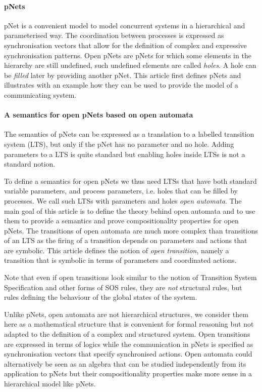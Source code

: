 \documentclass{elsarticle}
\begin{document}
\paragraph{pNets}
pNet is a convenient model to model concurrent systems in a hierarchical and parameterised way. The coordination between processes is expressed as synchronisation vectors that allow for the definition of complex and expressive synchronisation patterns.
Open pNets are pNets for which some elements in the hierarchy are still undefined, such undefined elements are called \emph{holes}. A hole can be \emph{filled} later by providing another pNet.
This article first defines pNets and illustrates with an example how they can be used to provide the model of a communicating system. 

\paragraph{A semantics for open pNets based on open automata}
The semantics of pNets can be expressed as a translation to a labelled transition system (LTS), but only if the pNet has no parameter and no hole. Adding parameters to a LTS is quite standard \cite{Lin:96} but enabling holes inside LTSs is not a standard notion.

To define a semantics for open pNets we thus need LTSs that have both standard variable parameters, and process parameters, i.e.  holes that can be filled by processes. We call such LTSs with parameters and holes \emph{open automata}. The main goal of this article is to define the theory behind open automata and to use them to provide a semantics and prove compositionality properties for open pNets.
  The transitions of open automata are much more complex than transitions of an LTS as the firing of a transition depends on parameters and actions that are symbolic. This article defines the notion of \emph{open transition}, namely a transition that is symbolic in terms of parameters and coordinated actions.

Note that even if open transitions  look similar to the notion of Transition System Specification \cite{GROOTE1992202,GROOTE20063} and other forms of SOS rules, they are \emph{not} structural rules, but rules defining the behaviour of the global states of the system.


Unlike pNets, open automata are not hierarchical structures, we consider them here as a mathematical structure that is convenient for formal reasoning but not adapted to the definition of a complex and structured system. 
Open transitions are expressed in terms of logics while the communication in pNets is specified as synchronisation vectors that specify synchronised actions.
Open automata could alternatively be  seen as an algebra that can be studied independently from its application to pNets but their compositionality properties make more sense in a hierarchical model like pNets.
\end{document}
